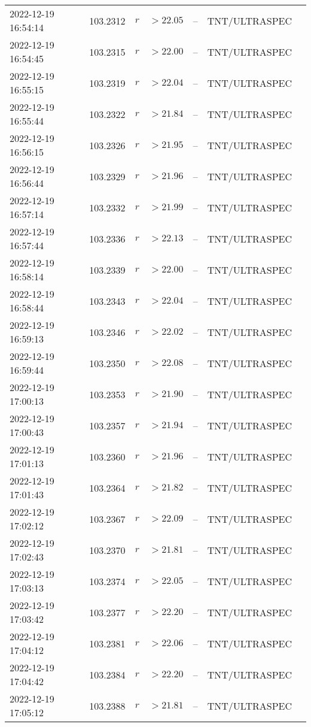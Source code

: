 \documentclass{nature_plusfigure}
\begin{document}
\begin{supplement}
\begin{center}
\begin{longtable}{lllllll}
2022-12-19 16:54:14 & 103.2312 & $r$ & $>22.05$ & -- & TNT/ULTRASPEC &  \\ 
2022-12-19 16:54:45 & 103.2315 & $r$ & $>22.00$ & -- & TNT/ULTRASPEC &  \\ 
2022-12-19 16:55:15 & 103.2319 & $r$ & $>22.04$ & -- & TNT/ULTRASPEC &  \\ 
2022-12-19 16:55:44 & 103.2322 & $r$ & $>21.84$ & -- & TNT/ULTRASPEC &  \\ 
2022-12-19 16:56:15 & 103.2326 & $r$ & $>21.95$ & -- & TNT/ULTRASPEC &  \\ 
2022-12-19 16:56:44 & 103.2329 & $r$ & $>21.96$ & -- & TNT/ULTRASPEC &  \\ 
2022-12-19 16:57:14 & 103.2332 & $r$ & $>21.99$ & -- & TNT/ULTRASPEC &  \\ 
2022-12-19 16:57:44 & 103.2336 & $r$ & $>22.13$ & -- & TNT/ULTRASPEC &  \\ 
2022-12-19 16:58:14 & 103.2339 & $r$ & $>22.00$ & -- & TNT/ULTRASPEC &  \\ 
2022-12-19 16:58:44 & 103.2343 & $r$ & $>22.04$ & -- & TNT/ULTRASPEC &  \\ 
2022-12-19 16:59:13 & 103.2346 & $r$ & $>22.02$ & -- & TNT/ULTRASPEC &  \\ 
2022-12-19 16:59:44 & 103.2350 & $r$ & $>22.08$ & -- & TNT/ULTRASPEC &  \\ 
2022-12-19 17:00:13 & 103.2353 & $r$ & $>21.90$ & -- & TNT/ULTRASPEC &  \\ 
2022-12-19 17:00:43 & 103.2357 & $r$ & $>21.94$ & -- & TNT/ULTRASPEC &  \\ 
2022-12-19 17:01:13 & 103.2360 & $r$ & $>21.96$ & -- & TNT/ULTRASPEC &  \\ 
2022-12-19 17:01:43 & 103.2364 & $r$ & $>21.82$ & -- & TNT/ULTRASPEC &  \\ 
2022-12-19 17:02:12 & 103.2367 & $r$ & $>22.09$ & -- & TNT/ULTRASPEC &  \\ 
2022-12-19 17:02:43 & 103.2370 & $r$ & $>21.81$ & -- & TNT/ULTRASPEC &  \\ 
2022-12-19 17:03:13 & 103.2374 & $r$ & $>22.05$ & -- & TNT/ULTRASPEC &  \\ 
2022-12-19 17:03:42 & 103.2377 & $r$ & $>22.20$ & -- & TNT/ULTRASPEC &  \\ 
2022-12-19 17:04:12 & 103.2381 & $r$ & $>22.06$ & -- & TNT/ULTRASPEC &  \\ 
2022-12-19 17:04:42 & 103.2384 & $r$ & $>22.20$ & -- & TNT/ULTRASPEC &  \\ 
2022-12-19 17:05:12 & 103.2388 & $r$ & $>21.81$ & -- & TNT/ULTRASPEC &  \\ 

\end{longtable}
\end{center}
\end{supplement}
\end{document}
